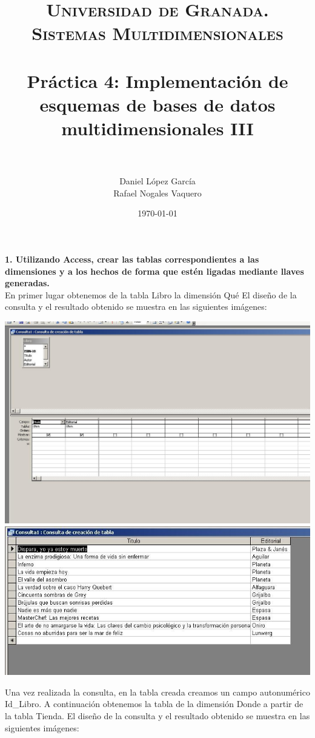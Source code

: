 \documentclass[paper=a4, fontsize=11pt, spanish]{scrartcl}
\title{
  \normalfont \normalsize 
  \textsc{Universidad de Granada.\\Sistemas Multidimensionales} \\ [25pt] %
  \horrule{0.5pt} \\[0.4cm] %
  \huge Práctica 4: Implementación de esquemas de bases de datos multidimensionales III \\ %
  \horrule{2pt} \\[0.5cm] %
}
\author{Daniel López García\\Rafael Nogales Vaquero} %
\date{\normalsize\today} %
\numberwithin{equation}{section} %
\numberwithin{figure}{section} %
\numberwithin{table}{section} %
\begin{document}
\maketitle %
\newpage
\textbf{1. Utilizando Access, crear las tablas correspondientes a las dimensiones y a los hechos de forma que estén ligadas mediante llaves generadas.}\\
En primer lugar obtenemos de la tabla Libro la dimensión Qué 
El diseño de la consulta y el resultado obtenido se muestra en las siguientes imágenes: 
\begin{center}
	\includegraphics[]{1.JPG}
	\includegraphics[]{2.JPG}
\end{center}
Una vez realizada la consulta, en la tabla creada creamos un campo autonumérico Id\_Libro.
A continuación obtenemos la tabla de la dimensión Donde a partir de la tabla Tienda.
El diseño de la consulta y el resultado obtenido se muestra en las siguientes imágenes: 
\end{document}
